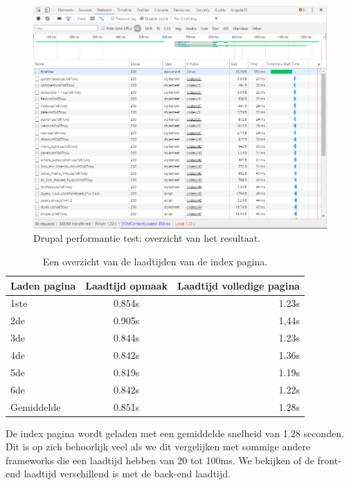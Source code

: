 \begin{figure}[!ht]
  \includegraphics[width=\textwidth]{img/dr-performance-test.png}
  \caption{Drupal performantie test: overzicht van het resultaat.}
  \label{fig:Drupal performantie test.}
\end{figure}

\pagebreak

\begin{table}[!ht]
\centering
\begin{tabular}{|l|c|r|}
    \hline
    Laden pagina & Laadtijd opmaak & Laadtijd volledige pagina\\
    \hline
    1ste & 0.854s & 1.23s\\
    \hline
    2de & 0.905s & 1,44s\\
    \hline
    3de & 0.844s & 1.23s\\
    \hline
    4de & 0.842s & 1.36s\\
    \hline
    5de & 0.819s & 1.19s\\
     \hline
    6de & 0.842s & 1.22s\\
    \hline
    Gemiddelde & 0.851s & 1.28s\\
    \hline
\end{tabular}
\caption{\label{tab:Drupal resultaten performantie front-end } Een overzicht van de laadtijden van de index pagina.}
\end{table}

\noindent
De index pagina wordt geladen met een gemiddelde snelheid van 1.28 seconden. Dit is op zich behoorlijk veel als we dit vergelijken met sommige andere frameworks die een laadtijd hebben van 20 tot 100ms. We bekijken of de front-end laadtijd verschillend is met de back-end laadtijd.

